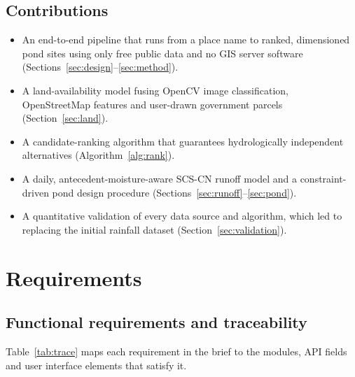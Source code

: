 \documentclass[11pt,a4paper]{article}
\begin{document}
\subsection{Contributions}
\begin{itemize}
  \item An end-to-end pipeline that runs from a place name to ranked, dimensioned pond sites using
        only free public data and no GIS server software (Sections~\ref{sec:design}--\ref{sec:method}).
  \item A land-availability model fusing OpenCV image classification, OpenStreetMap features and
        user-drawn government parcels (Section~\ref{sec:land}).
  \item A candidate-ranking algorithm that guarantees hydrologically independent alternatives
        (Algorithm~\ref{alg:rank}).
  \item A daily, antecedent-moisture-aware SCS-CN runoff model and a constraint-driven pond
        design procedure (Sections~\ref{sec:runoff}--\ref{sec:pond}).
  \item A quantitative validation of every data source and algorithm, which led to replacing
        the initial rainfall dataset (Section~\ref{sec:validation}).
\end{itemize}

\section{Requirements}
\subsection{Functional requirements and traceability}
Table~\ref{tab:trace} maps each requirement in the brief to the modules, API fields and user
interface elements that satisfy it.
\end{document}
